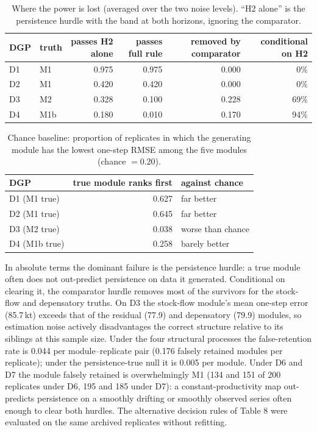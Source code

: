 \documentclass[preprint,11pt,authoryear]{elsarticle}
\theoremstyle{remark}
\begin{document}
\begin{table}[!htb]
\centering\footnotesize\setlength{\tabcolsep}{3.5pt}
\caption{Where the power is lost (averaged over the two noise levels). ``H2 alone'' is the persistence hurdle with the band at both horizons, ignoring the comparator.}
\label{tab:si_power}
\scriptsize\setlength{\tabcolsep}{2.5pt}
\begin{tabular}{@{}llrrrr@{}}
\toprule
DGP & truth & passes H2 alone & passes full rule & removed by comparator & conditional on H2 \\
\midrule
D1 & M1 & 0.975 & 0.975 & 0.000 & 0\% \\
D2 & M1 & 0.420 & 0.420 & 0.000 & 0\% \\
D3 & M2 & 0.328 & 0.100 & 0.228 & 69\% \\
D4 & M1b & 0.180 & 0.010 & 0.170 & 94\% \\
\bottomrule
\end{tabular}
\end{table}

\begin{table}[!htb]
\centering\footnotesize\setlength{\tabcolsep}{3.5pt}
\caption{Chance baseline: proportion of replicates in which the generating module has the lowest one-step RMSE among the five modules (chance $=0.20$).}
\label{tab:si_chance}
\begin{tabular}{@{}lrl@{}}
\toprule
DGP & true module ranks first & against chance \\
\midrule
D1 (M1 true) & 0.627 & far better \\
D2 (M1 true) & 0.645 & far better \\
D3 (M2 true) & 0.038 & worse than chance \\
D4 (M1b true) & 0.258 & barely better \\
\bottomrule
\end{tabular}
\end{table}

In absolute terms the dominant failure is the persistence hurdle: a true module often does not out-predict persistence on data it generated. Conditional on clearing it, the comparator hurdle removes most of the survivors for the stock-flow and depensatory truths. On D3 the stock-flow module's mean one-step error (85.7\,kt) exceeds that of the residual (77.9) and depensatory (79.9) modules, so estimation noise actively disadvantages the correct structure relative to its siblings at this sample size. Under the four structural processes the false-retention rate is 0.044 per module--replicate pair (0.176 falsely retained modules per replicate); under the persistence-true null it is 0.005 per module. Under D6 and D7 the module falsely retained is overwhelmingly M1 (134 and 151 of 200 replicates under D6, 195 and 185 under D7): a constant-productivity map out-predicts persistence on a smoothly drifting or smoothly observed series often enough to clear both hurdles. The alternative decision rules of Table 8 were evaluated on the same archived replicates without refitting.
\end{document}
